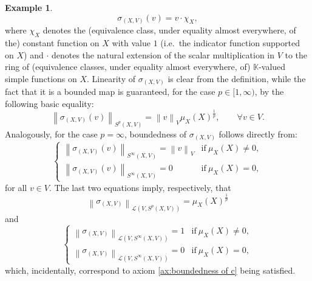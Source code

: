 \documentclass{amsart}
\theoremstyle{definition}
\newtheorem{example}[definition]{Example}
\theoremstyle{plain}
\newcommand{\K}{\mathbb{K}}
\newcommand{\norm}[1]{\left\lVert #1\right\rVert} %
\begin{document}
\begin{example}
            \begin{equation}
            \label{eq:definition of sigma}
                \sigma_{(X,V)}(v) = v \cdot \chi_X,
            \end{equation}
            where $\chi_X$ denotes the (equivalence class, under equality almost everywhere, of the) constant function on $X$ with value $1$ (i.e.~the indicator function supported on $X$) and $\cdot$ denotes the natural extension of the scalar multiplication in $V$ to the ring of (equivalence classes, under equality almost everywhere, of) $\K$-valued simple functions on $X$. 
            Linearity of $\sigma_{(X,V)}$ is clear from the definition, while the fact that it is a bounded map is guaranteed, for the case $p \in [1,\infty)$, by the following basic equality: 
            \begin{equation*}
                \norm{\sigma_{(X,V)}(v)}_{S^p(X,V)} = \norm{v}_V \mu_X(X)^{\frac{1}{p}}, \qquad \forall v \in V.
            \end{equation*}
            Analogously, for the case $p = \infty$, boundedness of $\sigma_{(X,V)}$ follows directly from:
            \begin{equation*}
                \begin{cases}
                    \norm{\sigma_{(X,V)}(v)}_{S^\infty(X,V)} = \norm{v}_V   & \text{if} ~ \mu_X(X) \neq 0, \\
                    \norm{\sigma_{(X,V)}(v)}_{S^\infty(X,V)} = 0   & \text{if} ~ \mu_X(X) = 0,
                \end{cases}
            \end{equation*} 
            for all $v \in V$. The last two equations imply, respectively, that 
            \begin{equation*}
                \norm{\sigma_{(X,V)}}_{\mathcal{L}\left( V,S^p(X,V) \right)} = \mu_X(X)^{\frac{1}{p}}
            \end{equation*}
            and
            \begin{equation*}
                \begin{cases}
                    \norm{\sigma_{(X,V)}}_{\mathcal{L}\left( V,S^\infty(X,V) \right)} = 1   & \text{if} ~ \mu_X(X) \neq 0, \\
                    \norm{\sigma_{(X,V)}}_{\mathcal{L}\left( V,S^\infty(X,V) \right)} = 0   & \text{if} ~ \mu_X(X) = 0,
                \end{cases}
            \end{equation*}
            which, incidentally, correspond to axiom \ref{ax:boundedness of c} being satisfied. \\

\end{example}
\end{document}
